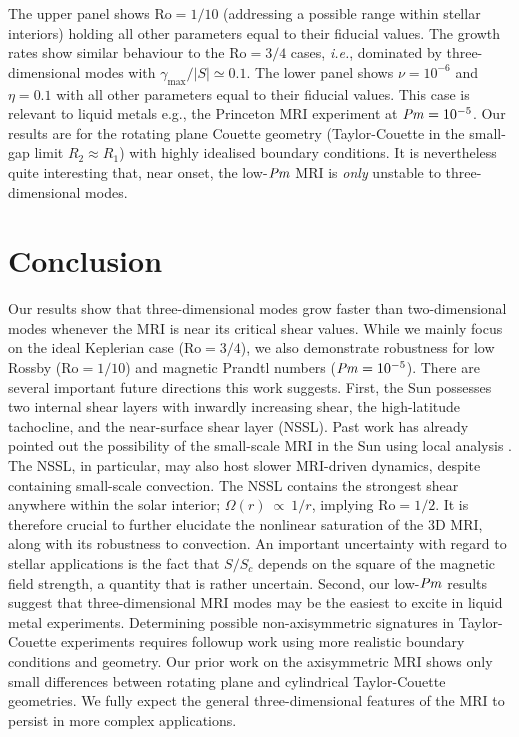 \documentclass[openacc]{rsproca_new}%
\newcommand{\SSC}{S/S_{c}}
\newcommand{\Prm}{\mbox{\textit{Pm}}}
\newcommand{\Ro}{\mathrm{Ro}}
\begin{document}
The upper panel shows $\Ro=1/10$ (addressing a possible range within stellar interiors) holding all other parameters equal to their fiducial values.
The growth rates show similar behaviour to the $\Ro=3/4$ cases, \textit{i.e.}, dominated by three-dimensional modes with $\gamma_{\max}/|S|\simeq0.1$.
The lower panel shows $\nu=10^{-6}$ and $\eta=0.1$ with all other parameters equal to their fiducial values. 
This case is relevant to liquid metals e.g., the Princeton MRI experiment \cite{2002JFM...462..365G}
at $\Prm=10^{-5}$. 
Our results are for the rotating plane Couette geometry (Taylor-Couette in the small-gap limit $R_{2}\approx{R}_{1}$) with highly idealised boundary conditions.
It is nevertheless quite interesting that, near onset, the low-$\Prm$ MRI is \emph{only} unstable to three-dimensional modes.

\section{Conclusion}
\label{sec:conclusion}

Our results show that three-dimensional modes grow faster than two-dimensional modes whenever the MRI is near its critical shear values.
While we mainly focus on the ideal Keplerian case ($\Ro=3/4$), we also demonstrate robustness for low Rossby ($\Ro=1/10$) and magnetic Prandtl numbers ($\Prm=10^{-5}$).
There are several important future directions this work suggests.
First, the Sun possesses two internal shear layers with inwardly increasing shear, the high-latitude tachocline, and the near-surface shear layer (NSSL). 
Past work has already pointed out the possibility of the small-scale MRI in the Sun using local analysis \cite{2007ApJ...667L.207P,2011MNRAS.411L..26M,2014ApJ...787...21K}.
The NSSL, in particular, may also host slower MRI-driven dynamics, despite containing small-scale convection.
The NSSL contains the strongest shear anywhere within the solar interior;  $\Omega(r) \ \propto \ 1/r$, implying $\Ro = 1/2$.
It is therefore crucial to further elucidate the nonlinear saturation of the 3D MRI, along with its robustness to convection.
An important uncertainty with regard to stellar applications is the fact that $\SSC$ depends on the square of the magnetic field strength, a quantity that is rather uncertain.
Second, our low-$\Prm$ results suggest that three-dimensional MRI modes may be the easiest to excite in liquid metal experiments.
Determining possible non-axisymmetric signatures in Taylor-Couette experiments requires followup work using more realistic boundary conditions and geometry. 
Our prior work on the axisymmetric MRI \cite{2017ApJ...841....1C,2017ApJ...841....2C} shows only small differences between rotating plane and cylindrical Taylor-Couette geometries. 
We fully expect the general three-dimensional features of the MRI to persist in more complex applications. 
\end{document}

